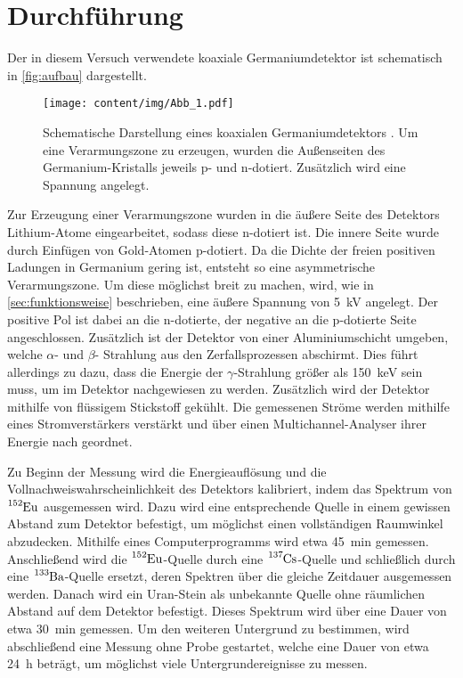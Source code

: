 \section{Durchführung}
\label{sec:durchfuehrung}

Der in diesem Versuch verwendete koaxiale Germaniumdetektor ist schematisch in \autoref{fig:aufbau} dargestellt.
\begin{figure}
    \centering
    \texttt{[image: content/img/Abb\_1.pdf]}
    \caption{Schematische Darstellung eines koaxialen Germaniumdetektors \cite{versuchsanleitung}.
    Um eine Verarmungszone zu erzeugen,
    wurden die Außenseiten des Germanium-Kristalls jeweils p- und n-dotiert.
    Zusätzlich wird eine Spannung angelegt.}
    \label{fig:aufbau}
\end{figure}

Zur Erzeugung einer Verarmungszone wurden in die äußere Seite des Detektors Lithium-Atome eingearbeitet,
sodass diese n-dotiert ist.
Die innere Seite wurde durch Einfügen von Gold-Atomen p-dotiert.
Da die Dichte der freien positiven Ladungen in Germanium gering ist,
entsteht so eine asymmetrische Verarmungszone.
Um diese möglichst breit zu machen,
wird,
wie in \autoref{sec:funktionsweise} beschrieben,
eine äußere Spannung von \SI{5}{\kilo\volt} angelegt.
Der positive Pol ist dabei an die n-dotierte,
der negative an die p-dotierte Seite angeschlossen.
Zusätzlich ist der Detektor von einer Aluminiumschicht umgeben,
welche $\alpha$- und $\beta$- Strahlung aus den Zerfallsprozessen abschirmt.
Dies führt allerdings zu dazu,
dass die Energie der $\gamma$-Strahlung größer als \SI{150}{\kilo\eV} sein muss, um im Detektor nachgewiesen zu werden.
Zusätzlich wird der Detektor mithilfe von flüssigem Stickstoff gekühlt.
Die gemessenen Ströme werden mithilfe eines Stromverstärkers verstärkt und über einen Multichannel-Analyser ihrer Energie nach geordnet.

Zu Beginn der Messung wird die Energieauflösung und die Vollnachweiswahrscheinlichkeit des Detektors kalibriert,
indem das Spektrum von $\ce{^{152}Eu}$ ausgemessen wird.
Dazu wird eine entsprechende Quelle in einem gewissen Abstand zum Detektor befestigt,
um möglichst einen vollständigen Raumwinkel abzudecken.
Mithilfe eines Computerprogramms wird etwa \SI{45}{\minute} gemessen.
Anschließend wird die $\ce{^{152}Eu}$-Quelle durch eine $\ce{^{137}Cs}$-Quelle und schließlich durch eine $\ce{^{133}Ba}$-Quelle ersetzt,
deren Spektren über die gleiche Zeitdauer ausgemessen werden.
Danach wird ein Uran-Stein als unbekannte Quelle ohne räumlichen Abstand auf dem Detektor befestigt.
Dieses Spektrum wird über eine Dauer von etwa \SI{30}{\minute} gemessen.
Um den weiteren Untergrund zu bestimmen,
wird abschließend eine Messung ohne Probe gestartet,
welche eine Dauer von etwa \SI{24}{\hour} beträgt,
um möglichst viele Untergrundereignisse zu messen.